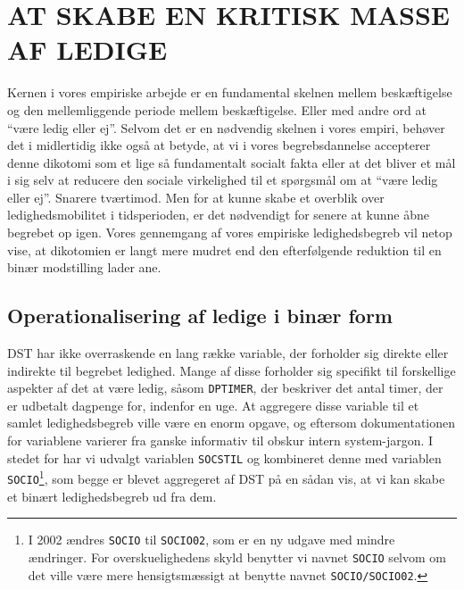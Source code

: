 \section{AT SKABE EN KRITISK MASSE AF LEDIGE \label{ledigskab}}

Kernen i vores empiriske arbejde er en fundamental skelnen mellem beskæftigelse og den mellemliggende periode mellem beskæftigelse. Eller med andre ord at “være ledig eller ej”. Selvom det er en nødvendig skelnen i vores empiri, behøver det i midlertidig ikke også at betyde, at vi i vores begrebsdannelse accepterer denne dikotomi som et lige så fundamentalt socialt fakta eller at det bliver et mål i sig selv at reducere den sociale virkelighed til et spørgsmål om at “være ledig eller ej”. Snarere tværtimod. Men for at kunne skabe et overblik over ledighedsmobilitet i tidsperioden, er det nødvendigt for senere at kunne åbne begrebet op igen. Vores gennemgang af vores empiriske ledighedsbegreb vil netop vise, at dikotomien er langt mere mudret end den efterfølgende reduktion til en binær modstilling lader ane. 


\subsection{Operationalisering af ledige i binær form \label{ledig_operationalisering}} 

DST har ikke overraskende en lang række variable, der forholder sig direkte eller indirekte til begrebet ledighed. Mange af disse forholder sig specifikt til forskellige aspekter af det at være ledig, såsom \texttt{DPTIMER}, der beskriver det antal timer, der er udbetalt dagpenge for, indenfor en uge. At aggregere disse variable til et samlet ledighedsbegreb ville være en enorm opgave, og eftersom dokumentationen for variablene varierer fra ganske informativ til obskur intern system-jargon. I stedet for har vi udvalgt variablen \texttt{SOCSTIL} og kombineret denne med variablen \texttt{SOCIO}\footnote{I 2002 ændres \texttt{SOCIO} til \texttt{SOCIO02}, som er en ny udgave med mindre ændringer. For overskuelighedens skyld benytter vi navnet \texttt{SOCIO} selvom om det ville være mere hensigtsmæssigt at benytte navnet \texttt{SOCIO/SOCIO02}.}, som begge er blevet aggregeret af DST på en sådan vis, at vi kan skabe et binært ledighedsbegreb ud fra dem.

